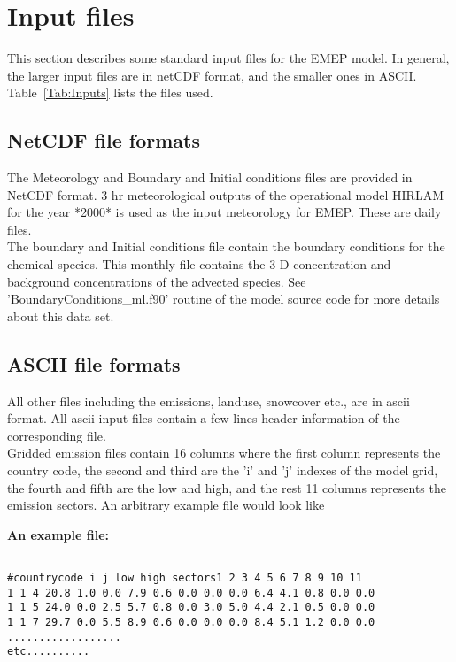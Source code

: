 \chapter{Input files}

This section describes some standard input files for the
EMEP model. In general, the larger input files
are in netCDF format, and the smaller ones in ASCII.
Table~\ref{Tab:Inputs} lists the files used.

\section{NetCDF file formats}

The Meteorology and Boundary and Initial conditions files are provided
in NetCDF format.  3 hr meteorological outputs of the 
operational model HIRLAM for the year *2000* is used as the input
meteorology for EMEP.  These are daily files. \\

The boundary and Initial conditions file contain the boundary
conditions for the chemical species.  This monthly file contains the
3-D concentration and background concentrations  of the advected
species.  See 'BoundaryConditions\_ml.f90' routine of the model source
code for more details about this data set.  

\section{ASCII file formats}

All other files including the emissions, landuse, snowcover etc., are
in ascii format.  All ascii input files contain a few lines header
information of the corresponding file.   \\

Gridded emission files contain 16 columns where the first column
represents the country code, the second and third are the 'i' and 'j'
indexes of the model grid, the fourth and fifth are the low and high,
and the rest 11 columns represents the emission sectors. An arbitrary
example file would look like  

\textbf{An example file:}

\begin{verbatim}

#countrycode i j low high sectors1 2 3 4 5 6 7 8 9 10 11 
1 1 4 20.8 1.0 0.0 7.9 0.6 0.0 0.0 0.0 6.4 4.1 0.8 0.0 0.0
1 1 5 24.0 0.0 2.5 5.7 0.8 0.0 3.0 5.0 4.4 2.1 0.5 0.0 0.0
1 1 7 29.7 0.0 5.5 8.9 0.6 0.0 0.0 0.0 8.4 5.1 1.2 0.0 0.0
..................
etc..........

\end{verbatim}




